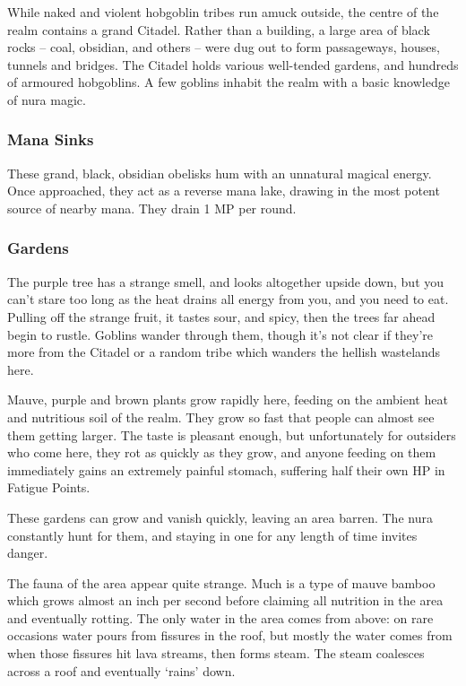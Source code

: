 \begin{multicols}{2}
While naked and violent hobgoblin tribes run amuck outside, the centre of the realm contains a grand Citadel.
Rather than a building, a large area of black rocks  -- coal, obsidian, and others -- were dug out to form passageways, houses, tunnels and bridges.
The Citadel holds various well-tended gardens, and hundreds of armoured hobgoblins.
A few goblins inhabit the realm with a basic knowledge of nura magic.

\subsubsection{Mana Sinks}

These grand, black, obsidian obelisks hum with an unnatural magical energy.
Once approached, they act as a reverse mana lake, drawing in the most potent source of nearby mana.
They drain 1 MP per round.

\subsubsection{Gardens}

\begin{boxtext}

  The purple tree has a strange smell, and looks altogether upside down, but you can't stare too long as the heat drains all energy from you, and you need to eat.
Pulling off the strange fruit, it tastes sour, and spicy, then the trees far ahead begin to rustle.
Goblins wander through them, though it's not clear if they're more from the Citadel or a random tribe which wanders the hellish wastelands here.

\end{boxtext}

Mauve, purple and brown plants grow rapidly here, feeding on the ambient heat and nutritious soil of the realm.  They grow so fast that people can almost see them getting larger.  The taste is pleasant enough, but unfortunately for outsiders who come here, they rot as quickly as they grow, and anyone feeding on them immediately gains an extremely painful stomach, suffering half their own HP in Fatigue Points.

These gardens can grow and vanish quickly, leaving an area barren.
The nura constantly hunt for them, and staying in one for any length of time invites danger.

The fauna of the area appear quite strange. Much is a type of mauve bamboo which grows almost an inch per second before claiming all nutrition in the area and eventually rotting.  The only water in the area comes from above: on rare occasions water pours from fissures in the roof, but mostly the water comes from when those fissures hit lava streams, then forms steam.  The steam coalesces across a roof and eventually `rains' down.


\end{multicols}
